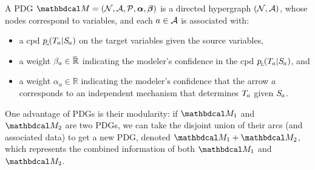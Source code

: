 \documentclass[twoside]{article}
\begin{document}
\begin{defn}
A PDG $\dg M = (\N, \Ar, \mathcal P, \balpha, \bbeta )
    $
    is a directed hypergraph  $(\mathcal N, \mathcal A)$, whose nodes correspond to variables, and
    each $a \in \mathcal A$ is associated with:
    \begin{itemize}[itemsep=0pt]
        \item a cpd $p\ssub a (\Tgt a | \Src a)$ on the target variables given the source variables,
        \item a weight $\beta_a \in \mskip1mu\overline{\mskip-1mu\mathbb R\!}\,$ indicating 
            the modeler's confidence in the cpd $p\ssub L(\Tgt a | \Src a)$, and 
        \item a weight $\alpha_a \in \mathbb R$ indicating 
            the modeler's confidence that the arrow $a$ corresponds to an independent mechanism that determines $\Tgt a$ given $\Src a$. 
        \qedhere
    \end{itemize}
\end{defn}

One advantage of PDGs is their modularity: if $\dg M_1$ and $\dg
M_2$ are two PDGs, we can take the disjoint union of their arcs (and
associated data) to get a new PDG, denoted $\dg M_1 + \dg M_2$, 
which represents the combined information of both $\dg M_1$ and $\dg M_2$.
\end{document}
